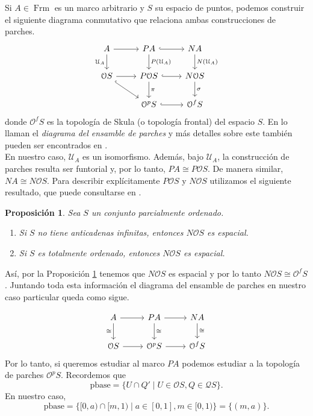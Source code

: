 \documentclass[11pt]{amsart}
\DeclareMathOperator{\Frm}{Frm}
\theoremstyle{plain}
\newtheorem{prop}[thm]{Proposición}
\theoremstyle{definition}
\begin{document}
Si $A\in\Frm$ es un marco arbitrario y $S$ su espacio de puntos, podemos construir el siguiente diagrama conmutativo que relaciona ambas construcciones de parches.
\[\begin{tikzcd}
	A & PA & NA \\
	{\mathcal{O}S} & {P\mathcal{O}S} & {N\mathcal{O}S} \\
	& {\mathcal{O}^pS} & {\mathcal{O}^fS}
	\arrow[from=1-1, to=1-2]
	\arrow["{\mathcal{U}_A}"', from=1-1, to=2-1]
	\arrow[hook, from=1-2, to=1-3]
	\arrow["{P(\mathcal{U}_A)}", from=1-2, to=2-2]
	\arrow["{N(\mathcal{U}_A)}", from=1-3, to=2-3]
	\arrow[from=2-1, to=2-2]
	\arrow[hook, from=2-1, to=3-2]
	\arrow[hook, from=2-2, to=2-3]
	\arrow["\pi", from=2-2, to=3-2]
	\arrow["\sigma", from=2-3, to=3-3]
	\arrow[hook, from=3-2, to=3-3]
\end{tikzcd}\]
donde $\mathcal{O}^fS$ es la topología de Skula (o topología frontal) del espacio $S$. En \cite{sexton2006point} lo llaman el 
\emph{diagrama del ensamble de parches} y más detalles sobre este también pueden ser encontrados
en \cite{sexton2003point}.\\

En nuestro caso, $\mathcal{U}_A$ es un isomorfismo. Además, bajo $\mathcal{U}_A$, la construcción de parches resulta ser funtorial y, por lo tanto,
$PA\cong P\mathcal{O}S$. De manera similar, $NA\cong N\mathcal{O}S$.
Para describir explícitamente $P\mathcal{O}S$ y $N\mathcal{O}S$ utilizamos el siguiente resultado, que puede consultarse en \cite{AvilaBezhaniMorandiZaldivar2020}.

\begin{prop}\label{Ensamble espacial}
Sea $S$ un conjunto parcialmente ordenado.
\begin{enumerate}
  \item Si $S$ no tiene anticadenas infinitas, entonces $N\mathcal{O}S$ es espacial.
  \item Si $S$ es totalmente ordenado, entonces $N\mathcal{O}S$ es espacial.
\end{enumerate}
\end{prop}

Así, por la Proposición \ref{Ensamble espacial} tenemos que $N\mathcal{O}S$ es espacial y por lo tanto $N\mathcal{O}S\cong \mathcal{O}^fS$. Juntando toda esta información 
el diagrama del ensamble de parches en nuestro caso particular queda como sigue.

\[\begin{tikzcd}
	A & PA & NA \\
	{\mathcal{O}S} & {\mathcal{O}^pS} & {\mathcal{O}^fS}
	\arrow[from=1-1, to=1-2]
	\arrow["\cong"', from=1-1, to=2-1]
	\arrow[from=1-2, to=1-3]
	\arrow["\cong", from=1-2, to=2-2]
	\arrow["\cong", from=1-3, to=2-3]
	\arrow[from=2-1, to=2-2]
	\arrow[from=2-2, to=2-3]
\end{tikzcd}\]
Por lo tanto, si queremos estudiar al marco $PA$ podemos estudiar a la topología de parches $\mathcal{O}^pS$. Recordemos que 
\[
\text{pbase}=\{U\cap Q'\mid U\in \mathcal{O}S, Q\in \mathcal{Q}S\}.
\]
En nuestro caso,
\[
\text{pbase}=\{[0, a)\cap [m, 1)\mid a\in [0,1], m\in [0,1)\}=\{(m,a)\}.
\]
\end{document}
